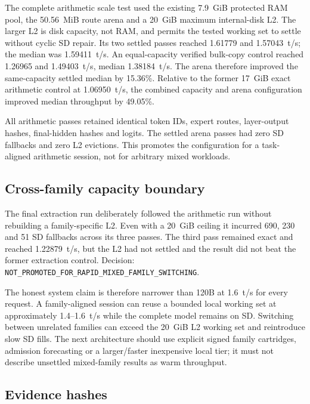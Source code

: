 The complete arithmetic scale test used the existing 7.9~GiB protected RAM
pool, the 50.56~MiB route arena and a 20~GiB maximum internal-disk L2. The
larger L2 is disk capacity, not RAM, and permits the tested working set to
settle without cyclic SD repair. Its two settled passes reached 1.61779 and
1.57043~t/s; the median was 1.59411~t/s. An equal-capacity verified bulk-copy
control reached 1.26965 and 1.49403~t/s, median 1.38184~t/s. The arena therefore
improved the same-capacity settled median by 15.36\%. Relative to the former
17~GiB exact arithmetic control at 1.06950~t/s, the combined capacity and arena
configuration improved median throughput by 49.05\%.

All arithmetic passes retained identical token IDs, expert routes,
layer-output hashes, final-hidden hashes and logits. The settled arena passes
had zero SD fallbacks and zero L2 evictions. This promotes the configuration
for a task-aligned arithmetic session, not for arbitrary mixed workloads.

\subsection{Cross-family capacity boundary}

The final extraction run deliberately followed the arithmetic run without
rebuilding a family-specific L2. Even with a 20~GiB ceiling it incurred 690,
230 and 51 SD fallbacks across its three passes. The third pass remained exact
and reached 1.22879~t/s, but the L2 had not settled and the result did not beat
the former extraction control. Decision:
\texttt{NOT\_PROMOTED\_FOR\_RAPID\_MIXED\_FAMILY\_SWITCHING}.

The honest system claim is therefore narrower than 120B at 1.6~t/s for every
request. A family-aligned session can reuse a bounded local working set at
approximately 1.4--1.6~t/s while the complete model remains on SD. Switching
between unrelated families can exceed the 20~GiB L2 working set and reintroduce
slow SD fills. The next architecture should use explicit signed family
cartridges, admission forecasting or a larger/faster inexpensive local tier;
it must not describe unsettled mixed-family results as warm throughput.

\subsection{Evidence hashes}

